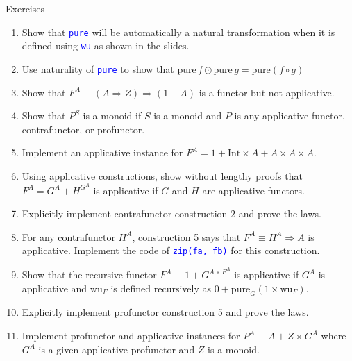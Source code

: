 \documentclass[english]{beamer}
\begin{document}
\begin{frame}{Exercises}
\begin{enumerate}
\item \vspace{-0.15cm}Show that \texttt{\textcolor{blue}{\footnotesize{}pure}}
will be automatically a natural transformation when it is defined
using \texttt{\textcolor{blue}{\footnotesize{}wu}} as shown in the
slides.
\item Use naturality of \texttt{\textcolor{blue}{\footnotesize{}pure}} to
show that $\text{pure}\,f\odot\text{pure}\,g=\text{pure}\left(f\circ g\right)$
\item Show that $F^{A}\equiv\left(A\Rightarrow Z\right)\Rightarrow\left(1+A\right)$
is a functor but not applicative.
\item Show that $P^{S}$ is a monoid if $S$ is a monoid and $P$ is any
applicative functor, contrafunctor, or profunctor.
\item Implement an applicative instance for $F^{A}=1+\text{Int}\times A+A\times A\times A$.
\item Using applicative constructions, show without lengthy proofs that
$F^{A}=G^{A}+H^{G^{A}}$ is applicative if $G$ and $H$ are applicative
functors.
\item Explicitly implement contrafunctor construction 2 and prove the laws.
\item For any contrafunctor $H^{A}$, construction 5 says that $F^{A}\equiv H^{A}\Rightarrow A$
is applicative. Implement the code of \texttt{\textcolor{blue}{\footnotesize{}zip(fa,
fb)}} for this construction.
\item Show that the recursive functor $F^{A}\equiv1+G^{A\times F^{A}}$
is applicative if $G^{A}$ is applicative and $\text{wu}_{F}$ is
defined recursively as $0+\text{pure}_{G}\left(1\times\text{wu}_{F}\right)$.
\item Explicitly implement profunctor construction 5 and prove the laws.
\item Implement profunctor and applicative instances for $P^{A}\equiv A+Z\times G^{A}$
where $G^{A}$ is a given applicative profunctor and $Z$ is a monoid.
\end{enumerate}
\end{frame}
\end{document}
